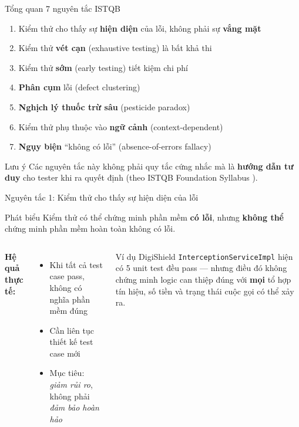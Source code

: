 \documentclass[aspectratio=169,12pt]{beamer}
\begin{document}
\begin{frame}{Tổng quan 7 nguyên tắc ISTQB}
  \begin{enumerate}
    \item Kiểm thử cho thấy sự \textbf{hiện diện} của lỗi, không phải sự \textbf{vắng mặt}
    \item Kiểm thử \textbf{vét cạn} (exhaustive testing) là bất khả thi
    \item Kiểm thử \textbf{sớm} (early testing) tiết kiệm chi phí
    \item \textbf{Phân cụm} lỗi (defect clustering)
    \item \textbf{Nghịch lý thuốc trừ sâu} (pesticide paradox)
    \item Kiểm thử phụ thuộc vào \textbf{ngữ cảnh} (context-dependent)
    \item \textbf{Ngụy biện} ``không có lỗi'' (absence-of-errors fallacy)
  \end{enumerate}

  \vspace{0.5em}
  \begin{block}{Lưu ý}
    Các nguyên tắc này không phải quy tắc cứng nhắc mà là \textbf{hướng dẫn tư duy}
    cho tester khi ra quyết định (theo ISTQB Foundation Syllabus \cite{istqb}).
  \end{block}
\end{frame}

\begin{frame}{Nguyên tắc 1: Kiểm thử cho thấy sự hiện diện của lỗi}
  \begin{block}{Phát biểu}
    Kiểm thử có thể chứng minh phần mềm \textbf{có lỗi}, nhưng \textbf{không thể}
    chứng minh phần mềm hoàn toàn không có lỗi.
  \end{block}

  \vspace{0.5em}
  \begin{columns}
    \textbf{Hệ quả thực tế:}
    \begin{itemize}
      \item Khi tất cả test case pass, không có nghĩa phần mềm đúng
      \item Cần liên tục thiết kế test case mới
      \item Mục tiêu: \textit{giảm rủi ro}, không phải \textit{đảm bảo hoàn hảo}
    \end{itemize}

    \begin{exampleblock}{Ví dụ DigiShield}
      \small \texttt{InterceptionServiceImpl} hiện có 5 unit test đều pass ---
      nhưng điều đó không chứng minh logic can thiệp đúng với \textbf{mọi} tổ hợp
      tín hiệu, số tiền và trạng thái cuộc gọi có thể xảy ra.
    \end{exampleblock}
  \end{columns}
\end{frame}
\end{document}
